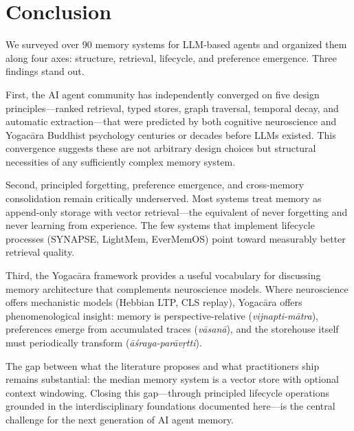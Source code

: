 \section{Conclusion}
\label{sec:conclusion}

We surveyed over 90 memory systems for LLM-based agents and organized
them along four axes: structure, retrieval, lifecycle, and preference
emergence. Three findings stand out.

First, the AI agent community has independently converged on five
design principles---ranked retrieval, typed stores, graph traversal,
temporal decay, and automatic extraction---that were predicted by both
cognitive neuroscience and Yogac\=ara Buddhist psychology centuries or
decades before LLMs existed. This convergence suggests these are
not arbitrary design choices but structural necessities of any
sufficiently complex memory system.

Second, principled forgetting, preference emergence, and cross-memory
consolidation remain critically underserved. Most systems treat memory
as append-only storage with vector retrieval---the equivalent of
never forgetting and never learning from experience. The few systems
that implement lifecycle processes (SYNAPSE, LightMem, EverMemOS) point
toward measurably better retrieval quality.

Third, the Yogac\=ara framework provides a useful vocabulary for
discussing memory architecture that complements neuroscience models.
Where neuroscience offers mechanistic models (Hebbian LTP, CLS replay),
Yogac\=ara offers phenomenological insight: memory is perspective-relative
(\emph{vijnapti-m\=atra}), preferences emerge from accumulated traces
(\emph{v\=asan\=a}), and the storehouse itself must periodically
transform (\emph{\=a\'sraya-par\=av\d{r}tti}).

The gap between what the literature proposes and what practitioners
ship remains substantial: the median memory system is a vector store
with optional context windowing. Closing this gap---through principled
lifecycle operations grounded in the interdisciplinary foundations
documented here---is the central challenge for the next generation of
AI agent memory.
